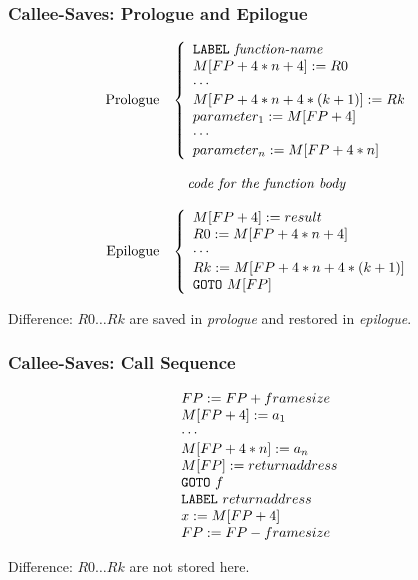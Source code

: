 \documentclass{beamer}
\newcommand{\emp}[1]{\textcolor{DikuRed}{ #1}}
\begin{document}
\begin{frame}
\frametitle{Callee-Saves: Prologue and Epilogue}

\renewcommand{\arraystretch}{0.9}

\[\begin{array}{rl}

\mbox{Prologue} & \left\{
{\begin{array}{l}
{\tt LABEL}~\mbox{\it function-name} \\
M[FP+4*n+4] := R0 \\
\cdots \\
M[FP+4*n+4*(k+1)] := Rk \\
parameter_1 := M[FP+4] \\
\cdots \\
parameter_n := M[FP+4*n]
\end{array}}
\right. \\
\\
& ~~~\mbox{\it code for the function body} \\
\\
\mbox{Epilogue} & \left\{
{\begin{array}{l}
M[FP+4] := result \\
R0 := M[FP+4*n+4] \\
\cdots \\
Rk := M[FP+4*n+4*(k+1)] \\
{\tt GOTO}~M[FP]
\end{array}}
\right.
\end{array}\]

\emp{Difference: $R0\ldots Rk$ are saved in {\em prologue} and restored in {\em epilogue}.}

\end{frame}


\begin{frame}
\frametitle{Callee-Saves: Call Sequence}

\renewcommand{\arraystretch}{0.9}

\[\begin{array}{l}
FP := FP + framesize \\
M[FP + 4] := a_1 \\
\cdots \\
M[FP + 4*n] := a_n \\
M[FP] := returnaddress \\
{\tt GOTO}~f \\
{\tt LABEL}~returnaddress \\
x := M[FP+4] \\
FP := FP - framesize
\end{array}\]

\bigskip

\emp{Difference: $R0\ldots Rk$ are not stored here.}

\end{frame}
\end{document}
